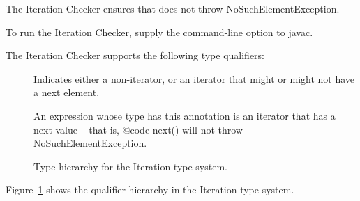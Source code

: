 \htmlhr
{}

The Iteration Checker ensures that  does not throw NoSuchElementException.

To run the Iteration Checker, supply the
command-line option to javac.

The Iteration Checker supports the following type qualifiers:
\begin{description}

    \item[]
    Indicates either a non-iterator, or an iterator that might or might not have a next element.

    \item[]
    An expression whose type has this annotation is an iterator that has a next value -- that is,
    {@code next()} will not throw NoSuchElementException.

\end{description}

\begin{figure}
    \caption{Type hierarchy for the Iteration type system.}
    \label{fig-iteration-hierarchy}
\end{figure}

Figure~\ref{fig-iteration-hierarchy} shows the qualifier hierarchy in the Iteration type system.

